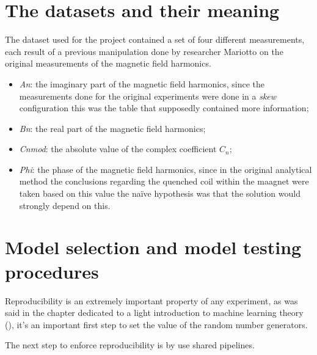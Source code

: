 \section{The datasets and their meaning}
The dataset used for the project contained a set of four different measurements, each result of a
previous manipulation done by researcher Mariotto on the original measurements of the magnetic field
harmonics.

\begin{itemize}
	\item \emph{An}: the imaginary part of the magnetic field harmonics, since the measurements
	      done for the original experiments were done in a \emph{skew}
	      configuration this was the
	      table that supposedly contained more information;
	\item \emph{Bn}: the real part of the magnetic field harmonics;
	\item \emph{Cnmod}: the absolute value of the complex coefficient $C_n$;
	\item \emph{Phi}: the phase of the magnetic field harmonics, since in the original
	      analytical method the conclusions regarding the quenched coil within the maagnet were taken
	      based on this value the naïve hypothesis was that the \qlp solution would strongly depend on
	      this.
\end{itemize}

\section{Model selection and model testing procedures}
Reproducibility is an extremely important property of any experiment, as was said in the chapter
dedicated to a light introduction to machine learning theory (), it's an important
first step to set the value of the random number generators.

The next step to enforce reproducibility is by use shared pipelines.

